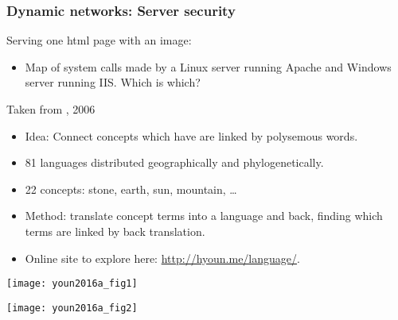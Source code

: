 \begin{frame}
  \frametitle{Dynamic networks: Server security}

  \begin{block}{Serving one html page with an image:}
    \bigskip
    \setlength\fboxsep{0pt}
    \setlength\fboxrule{1pt}
    \begin{itemize}
    \item 
      Map of system calls made by a Linux server running Apache and
      Windows server running IIS.  Which is which?
    \end{itemize}
  \end{block}

  {\small
  Taken from
  ,
2006}
  
\end{frame}

\begin{frame}
  
  \begin{itemize}
  \item<+->
    Idea: Connect 
    concepts which have are linked by polysemous words.
  \item<+->
    81 languages distributed geographically and phylogenetically.
  \item<+->
    22 concepts: stone, earth, sun, mountain, \ldots
  \item<+->
    Method: translate concept terms into a language and back, finding
    which terms are linked by back translation.
  \item<+->
    Online site to explore here:
    \url{http://hyoun.me/language/}.
  \end{itemize}
\end{frame}

\begin{frame}

  \begin{center}
    \texttt{[image: youn2016a\_fig1]}
  \end{center}

\end{frame}


\begin{frame}

  \begin{center}
    \texttt{[image: youn2016a\_fig2]}
  \end{center}

\end{frame}

